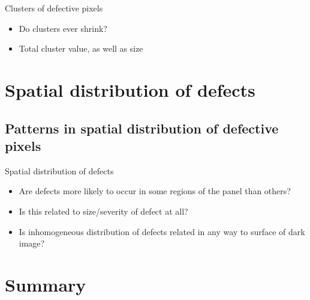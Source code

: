 \documentclass{beamer}
\begin{document}
\begin{frame}{Clusters of defective pixels}
	\begin{itemize}
		\item Do clusters ever shrink?
		\item Total cluster value, as well as size
		
	\end{itemize}

\end{frame}




\section{Spatial distribution of defects}
\subsection{Patterns in spatial distribution of defective pixels}

\begin{frame}{Spatial distribution of defects}

	\begin{itemize}
		\item Are defects more likely to occur in some regions of the panel than others?
		\item Is this related to size/severity of defect at all?
		\item Is inhomogeneous distribution of defects related in any way to surface of dark image?
	\end{itemize}

\end{frame}



\section*{Summary}
\end{document}
